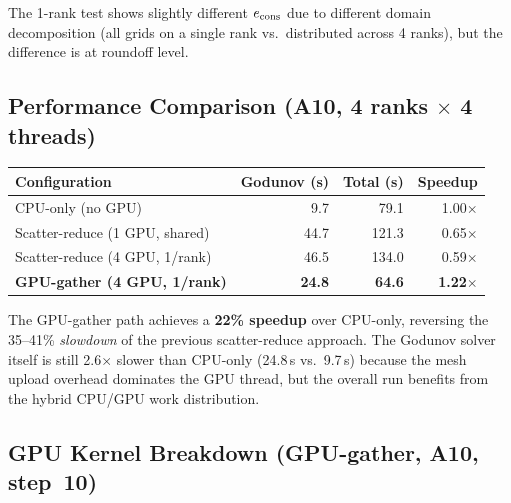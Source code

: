 \documentclass[11pt,fleqn]{book}
\begin{document}
The 1-rank test shows slightly different $e_{\rm cons}$ due to different domain decomposition (all grids on a single rank vs.\ distributed across 4 ranks), but the difference is at roundoff level.

\subsection{Performance Comparison (A10, 4 ranks $\times$ 4 threads)}

\begin{center}
\begin{tabular}{lrrr}
\toprule
\textbf{Configuration} & \textbf{Godunov (s)} & \textbf{Total (s)} & \textbf{Speedup} \\
\midrule
CPU-only (no GPU)                  &  9.7 &  79.1 & 1.00$\times$ \\
Scatter-reduce (1 GPU, shared)     & 44.7 & 121.3 & 0.65$\times$ \\
Scatter-reduce (4 GPU, 1/rank)     & 46.5 & 134.0 & 0.59$\times$ \\
\textbf{GPU-gather (4 GPU, 1/rank)} & \textbf{24.8} & \textbf{64.6} & \textbf{1.22$\times$} \\
\bottomrule
\end{tabular}
\end{center}

The GPU-gather path achieves a \textbf{22\% speedup} over CPU-only, reversing the 35--41\% \emph{slowdown} of the previous scatter-reduce approach.  The Godunov solver itself is still 2.6$\times$ slower than CPU-only (24.8\,s vs.\ 9.7\,s) because the mesh upload overhead dominates the GPU thread, but the overall run benefits from the hybrid CPU/GPU work distribution.

\subsection{GPU Kernel Breakdown (GPU-gather, A10, step~10)}
\end{document}
